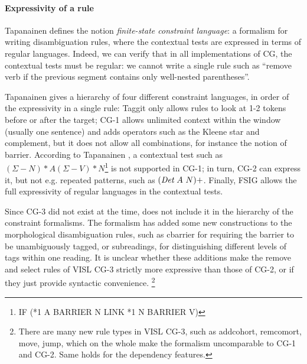 \paragraph{Expressivity of a rule}

Tapanainen \cite{tapanainen1999phd} defines the notion \emph{finite-state constraint language}: a formalism for writing disambiguation rules, 
where the contextual tests are expressed in terms of regular languages.
Indeed, we can verify that in all implementations of CG, 
the contextual tests must be regular: we cannot write a single rule such as 
``remove verb if the previous segment contains only well-nested parentheses''.

Tapanainen gives a hierarchy of four different constraint languages, in order of the expressivity in a single rule: Taggit \cite{taggit} only allows rules to look at 1-2 tokens before or after the target; CG-1 \cite{karlsson1990cgp} allows unlimited context within the window (usually one sentence) and adds operators such as the Kleene star and complement, but it does not allow all combinations, for instance the notion of barrier. According to Tapanainen \cite{tapanainen1999phd}, a contextual test such as $(\Sigma - N)*A(\Sigma - V)*N$\footnote{IF (*1 A BARRIER N LINK *1 N BARRIER V)} is not supported in CG-1; in turn, CG-2 \cite{tapanainen1996} can express it, but not e.g. repeated patterns, such as $(\text{\em Det} \  A \  N)+$. Finally, FSIG \cite{koskenniemi90} allows the full expressivity of regular languages in the contextual tests.

Since CG-3 \cite{vislcg3,bick2015} did not exist at the time, \cite{tapanainen1999phd} does not include it in the hierarchy of the constraint formalisms.
The formalism has added some new constructions to the morphological disambiguation rules, 
such as {\sc cbarrier} for requiring the barrier to be unambiguously tagged, or subreadings, for distinguishing different levels of tags within one reading. 
It is unclear whether these additions make the {\sc remove} and {\sc select} rules of VISL CG-3 strictly more expressive than those of CG-2, or if they just provide syntactic convenience.
\footnote{There are many new rule types in VISL CG-3, such as {\sc addcohort}, {\sc remcomort}, {\sc move}, {\sc jump}, which on the whole make the formalism uncomparable to CG-1 and CG-2. Same holds for the dependency features.}




